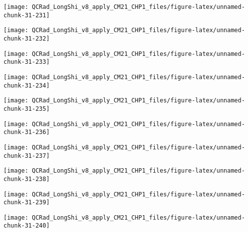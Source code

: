 \documentclass[
  10pt,
  a4paper,oneside]{article}
\begin{document}
\begin{center}\texttt{[image: QCRad\_LongShi\_v8\_apply\_CM21\_CHP1\_files/figure-latex/unnamed-chunk-31-231]} \end{center}

\begin{center}\texttt{[image: QCRad\_LongShi\_v8\_apply\_CM21\_CHP1\_files/figure-latex/unnamed-chunk-31-232]} \end{center}

\begin{center}\texttt{[image: QCRad\_LongShi\_v8\_apply\_CM21\_CHP1\_files/figure-latex/unnamed-chunk-31-233]} \end{center}

\begin{center}\texttt{[image: QCRad\_LongShi\_v8\_apply\_CM21\_CHP1\_files/figure-latex/unnamed-chunk-31-234]} \end{center}

\begin{center}\texttt{[image: QCRad\_LongShi\_v8\_apply\_CM21\_CHP1\_files/figure-latex/unnamed-chunk-31-235]} \end{center}

\begin{center}\texttt{[image: QCRad\_LongShi\_v8\_apply\_CM21\_CHP1\_files/figure-latex/unnamed-chunk-31-236]} \end{center}

\begin{center}\texttt{[image: QCRad\_LongShi\_v8\_apply\_CM21\_CHP1\_files/figure-latex/unnamed-chunk-31-237]} \end{center}

\begin{center}\texttt{[image: QCRad\_LongShi\_v8\_apply\_CM21\_CHP1\_files/figure-latex/unnamed-chunk-31-238]} \end{center}

\begin{center}\texttt{[image: QCRad\_LongShi\_v8\_apply\_CM21\_CHP1\_files/figure-latex/unnamed-chunk-31-239]} \end{center}

\begin{center}\texttt{[image: QCRad\_LongShi\_v8\_apply\_CM21\_CHP1\_files/figure-latex/unnamed-chunk-31-240]} \end{center}
\end{document}
